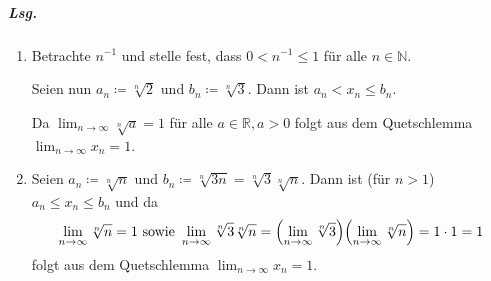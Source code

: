 \documentclass{scrreprt}
\begin{document}
\begin{enumerate}[(a)]
  \subparagraph{Lsg.}
  \begin{enumerate}[(1)]
  \item Betrachte $n^{-1}$ und stelle fest, dass $0 < n^{-1} \leq 1$ für alle
    $n \in \mathbb{N}$.

    Seien nun $a_n \coloneqq \sqrt[n]{2}$ und $b_n \coloneqq \sqrt[n]{3}$.
    Dann ist $a_n < x_n \leq b_n$.

    Da $\lim_{n \to \infty} \sqrt[n]{a} = 1$ für alle $a \in \mathbb{R}, a > 0$
    folgt aus dem Quetschlemma $\lim_{n \to \infty} x_n = 1$.

  \item Seien $a_n \coloneqq \sqrt[n]{n}$ und
    $b_n \coloneqq \sqrt[n]{3n} = \sqrt[n]{3}\sqrt[n]{n}$.
    Dann ist (für $n > 1$) $a_n \leq x_n \leq b_n$ und da
    \[
      \lim_{n \to \infty} \sqrt[n]{n} = 1
      \text{ sowie }
      \lim_{n \to \infty} \sqrt[n]{3}\sqrt[n]{n} =
      \qty(\lim_{n \to \infty} \sqrt[n]{3})\qty(\lim_{n \to \infty} \sqrt[n]{n}) =
      1 \cdot 1 = 1
    \]
    folgt aus dem Quetschlemma $\lim_{n \to \infty} x_n = 1$.
  \end{enumerate}

\end{enumerate}
\end{document}
